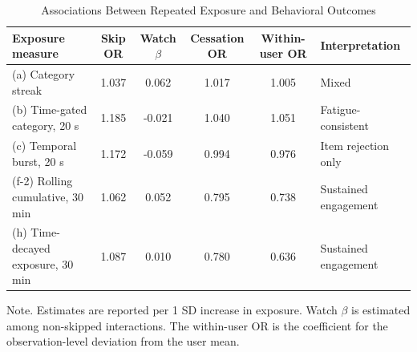 \begin{table}
  \caption{Associations Between Repeated Exposure and Behavioral Outcomes}
  \label{tab:associations}
  \begin{tabular}{lccccl}
    \toprule
    Exposure measure & Skip OR & Watch $\beta$ & Cessation OR & Within-user OR & Interpretation \\
    \midrule
    (a) Category streak & 1.037 & 0.062 & 1.017 & 1.005 & Mixed \\
    (b) Time-gated category, 20 s & 1.185 & -0.021 & 1.040 & 1.051 & Fatigue-consistent \\
    (c) Temporal burst, 20 s & 1.172 & -0.059 & 0.994 & 0.976 & Item rejection only \\
    (f-2) Rolling cumulative, 30 min & 1.062 & 0.052 & 0.795 & 0.738 & Sustained engagement \\
    (h) Time-decayed exposure, 30 min & 1.087 & 0.010 & 0.780 & 0.636 & Sustained engagement \\
    \bottomrule
  \end{tabular}
  \begin{flushleft}
  \footnotesize
  Note. Estimates are reported per 1 SD increase in exposure. Watch $\beta$ is estimated among non-skipped interactions. The within-user OR is the coefficient for the observation-level deviation from the user mean.
  \end{flushleft}
\end{table}
